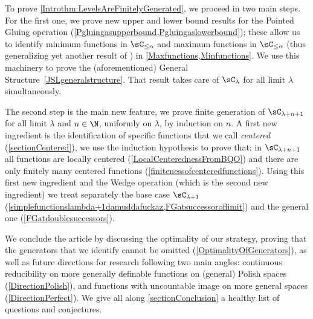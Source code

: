 To prove \cref{Introthm:LevelsAreFinitelyGenerated}, we proceed in two main steps.
For the first one, we prove new upper and lower bound results for the Pointed Gluing operation (\cref{Pgluingasupperbound,Pgluingaslowerbound});
these allow us to identify minimum functions in $\sC_{\leq \alpha}$ and maximum functions in $\sC_{\leq \alpha}$ (thus generalizing yet another result of \cite{carroy2013quasi}) in \cref{Maxfunctions,Minfunctions}.
We use this machinery to prove the (aforementioned) General Structure~\cref{JSLgeneralstructure}. That result takes care of $\sC_\lambda$ for all limit $\lambda$ simultaneously.

The second step is the main new feature, we prove finite generation of $\sC_{\lambda+n+1}$ for all limit $\lambda$ and $n\in\N$, uniformly on $\lambda$, by induction on $n$.
A first new ingredient is the identification of specific functions that we call \emph{centered} (\cref{sectionCentered}), we use the induction hypothesis to prove that:
in $\sC_{\lambda+n+1}$ all functions are locally centered (\cref{LocalCenterednessFromBQO}) and there are only finitely many centered functions (\cref{finitenessofcenteredfunctions}).
Using this first new ingredient and the Wedge operation (which is the second new ingredient) we treat separately the base case $\sC_{\lambda+1}$
(\cref{simplefunctionslambda+1damuddafuckaz,FGatsuccessoroflimit}) and the general one (\cref{FGatdoublesuccessors}).

We conclude the article by discussing the optimality of our strategy, proving that the generators that we identify cannot be omitted (\cref{OptimalityOfGenerators}), as well as
future directions for research following two main angles: continuous reducibility on more generally definable functions on (general) Polish spaces (\cref{DirectionPolish}),
and functions with uncountable image on more general spaces (\cref{DirectionPerfect}). We give all along \cref{sectionConclusion} a healthy list of questions and conjectures.



